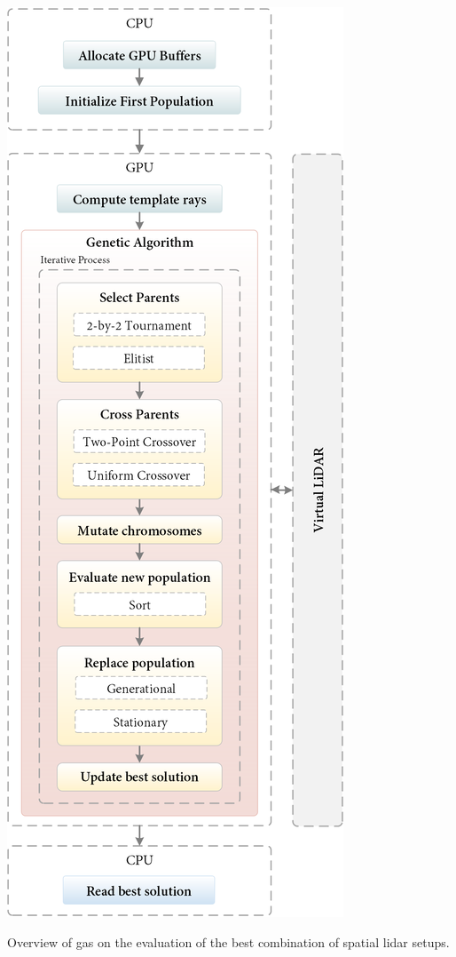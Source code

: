 \begin{marginfigure}[0.0cm]
    \centering
    \includegraphics[width=\linewidth]{figs/lidar_optimization/genetic_overview.png}
	\caption{Overview of \acrshort{ga}s on the evaluation of the best combination of spatial \acrshort{lidar} setups.}
	\label{fig:genetic_overview}
\end{marginfigure}
